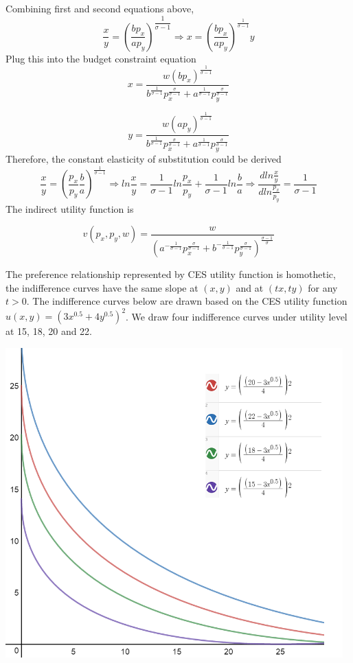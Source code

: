 Combining first and second equations above,
\begin{equation}
\frac{x}{y} =(\frac{bp_{x}}{ap_{y}})^{\dfrac{1}{\sigma-1}} \Rightarrow x= (\frac{bp_{x}}{ap_{y}})^{\frac{1}{\sigma-1}}y
\end{equation}
Plug this into the budget constraint equation
\begin{equation}
x=\frac{w(bp_{x})^{\frac{1}{\sigma-1}}}{b^{\frac{1}{\sigma-1}}p_{x}^{\frac{\sigma}{\sigma-1}}+a^{\frac{1}{\sigma-1}}p_{y}^{\frac{\sigma}{\sigma-1}}}
\end{equation}

\begin{equation}
y=\frac{w(ap_{y})^{\frac{1}{\sigma-1}}}{b^{\frac{1}{\sigma-1}}p_{x}^{\frac{\sigma}{\sigma-1}}+a^{\frac{1}{\sigma-1}}p_{y}^{\frac{\sigma}{\sigma-1}}}
\end{equation}
Therefore, the constant elasticity of substitution could be derived
\begin{equation}
\frac{x}{y}=(\frac{p_{x}}{p_{y}}\frac{b}{a})^{\frac{1}{\sigma-1}} \Rightarrow ln\frac{x}{y}=\frac{1}{\sigma-1}ln\frac{p_{x}}{p_{y}}+\frac{1}{\sigma-1}ln\frac{b}{a} \Rightarrow \frac{d ln\frac{x}{y} }{ d ln\frac{p_{x}}{p_{y}}}=\frac{1}{\sigma-1}
\end{equation}
The indirect utility function is

\begin{equation}
v(p_{x},p_{y},w)=\frac{w}{(a^{-\frac{1}{\sigma-1}}p_{x}^{\frac{\sigma}{\sigma-1}}+b^{-\frac{1}{\sigma-1}}p_{y}^{\frac{\sigma}{\sigma-1}})^{\frac{\sigma-1}{\sigma}}}
\end{equation}

The preference relationship represented by CES utility function is homothetic, the indifference curves have the same slope at $(x,y)$ and at $(tx,ty)$ for any $t > 0$. The indifference curves below are drawn based on the CES utility function $u(x,y)=(3x^{0.5}+4y^{0.5})^2$. We draw four indifference curves under utility level at 15, 18, 20 and 22.
\begin{center}
\includegraphics[width=13cm]{Untitled.png}
\end{center}

